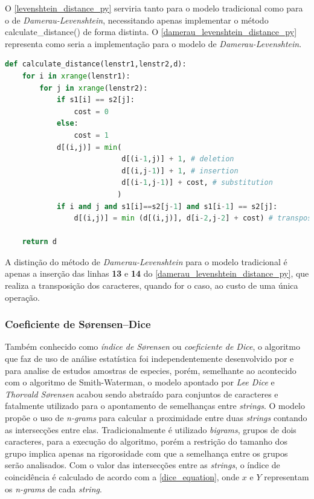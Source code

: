 O \autoref{levenshtein_distance_py} serviria tanto para o modelo tradicional como para o de \textit{Damerau-Levenshtein}, necessitando apenas implementar o método {\code calculate\_distance()} de forma distinta. O \autoref{damerau_levenshtein_distance_py} representa como seria a implementação para o modelo de \textit{Damerau-Levenshtein}.

\begin{lstlisting}[language=Python,label=damerau_levenshtein_distance_py,caption={Implementação da distância de Damerau-Levenshtein}]
def calculate_distance(lenstr1,lenstr2,d):
    for i in xrange(lenstr1):
        for j in xrange(lenstr2):
            if s1[i] == s2[j]:
                cost = 0
            else:
                cost = 1
            d[(i,j)] = min(
                           d[(i-1,j)] + 1, # deletion
                           d[(i,j-1)] + 1, # insertion
                           d[(i-1,j-1)] + cost, # substitution
                          )
            if i and j and s1[i]==s2[j-1] and s1[i-1] == s2[j]:
                d[(i,j)] = min (d[(i,j)], d[i-2,j-2] + cost) # transposition
 
    return d
\end{lstlisting}

A distinção do método de \textit{Damerau-Levenshtein} para o modelo tradicional é apenas a inserção das linhas \textbf{13} e \textbf{14} do \autoref{damerau_levenshtein_distance_py}, que realiza a transposição dos caracteres, quando for o caso, ao custo de uma única operação.

\subsubsection*{Coeficiente de Sørensen–Dice} %
\label{ssub:s_rensen_dice_coefficient}

Também conhecido como \textit{índice de Sørensen} ou \textit{coeficiente de Dice}, o algoritmo que faz de uso de análise estatística foi independentemente desenvolvido por  e  para analise  de estudos amostras de especies, porém, semelhante ao acontecido com o algoritmo de Smith-Waterman\cite{smith1981identification}, o modelo apontado por \textit{Lee Dice} e \textit{Thorvald Sørensen} acabou sendo abstraído para conjuntos de caracteres e fatalmente utilizado para o apontamento de semelhanças entre \textit{strings}. O modelo propõe o uso de \textit{n-grams}\cite{cavnar1994n} para calcular a proximidade entre duas \textit{strings} contando as intersecções entre elas. Tradicionalmente é utilizado \textit{bigrams}, grupos de dois caracteres, para a execução do algoritmo, porém a restrição do tamanho dos grupo implica apenas na rigorosidade com que a semelhança entre os grupos serão analisados. Com o valor das intersecções entre as \textit{strings}, o índice de coincidência é calculado de acordo com a \autoref{dice_equation}, onde $x$ e $Y$ representam os \textit{n-grams} de cada \textit{string}.

